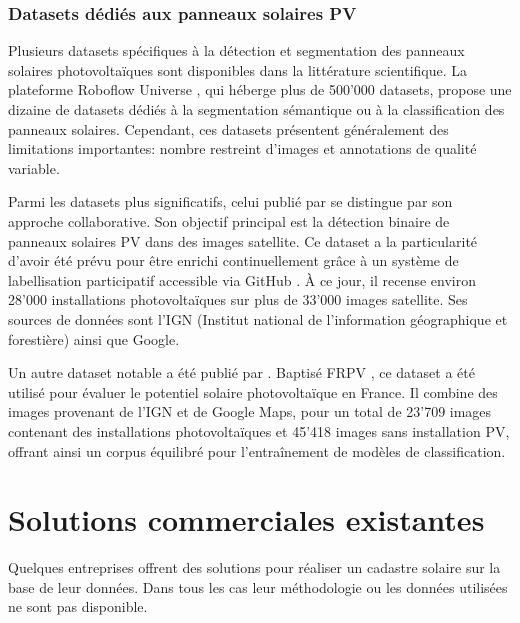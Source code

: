 \subsubsection{Datasets dédiés aux panneaux solaires PV}
\par{Plusieurs datasets spécifiques à la détection et segmentation des panneaux solaires photovoltaïques sont disponibles dans la littérature scientifique. La plateforme Roboflow Universe \cite{roboflow_roboflow_nodate}, qui héberge plus de 500'000 datasets, propose une dizaine de datasets dédiés à la segmentation sémantique ou à la classification des panneaux solaires. Cependant, ces datasets présentent généralement des limitations importantes: nombre restreint d'images et annotations de qualité variable.}
\par{Parmi les datasets plus significatifs, celui publié par \citeauthor{kasmi_crowdsourced_2023} \cite{kasmi_crowdsourced_2023, kasmi_crowdsourced_2022} se distingue par son approche collaborative. Son objectif principal est la détection binaire de panneaux solaires PV dans des images satellite. Ce dataset a la particularité d'avoir été prévu pour être enrichi continuellement grâce à un système de labellisation participatif accessible via GitHub \cite{gabrielkasmi_gabrielkasmibdappv_2025}. À ce jour, il recense environ 28'000 installations photovoltaïques sur plus de 33'000 images satellite. Ses sources de données sont l'IGN (Institut national de l'information géographique et forestière) ainsi que Google.}
\par{Un autre dataset notable a été publié par \citeauthor{thebault_comprehensive_2025} \cite{thebault_comprehensive_2025}. Baptisé FRPV \cite{thebault_frpv_2025}, ce dataset a été utilisé pour évaluer le potentiel solaire photovoltaïque en France. Il combine des images provenant de l'IGN et de Google Maps, pour un total de 23'709 images contenant des installations photovoltaïques et 45'418 images sans installation PV, offrant ainsi un corpus équilibré pour l'entraînement de modèles de classification.}

\section{Solutions commerciales existantes}
\par{Quelques entreprises offrent des solutions pour réaliser un cadastre solaire sur la base de leur données. Dans tous les cas leur méthodologie ou les données utilisées ne sont pas disponible.}

